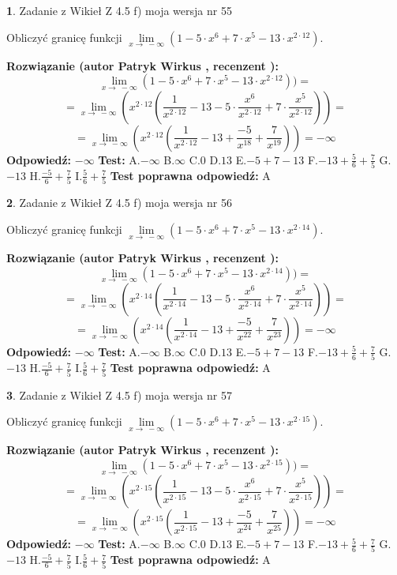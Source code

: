 \documentclass[12pt, a4paper]{article}
\theoremstyle{definition} %
\newtheorem{zad}{}
\newcommand{\zadStart}[1]{\begin{zad}#1\newline}
\newcommand{\zadStop}{\end{zad}}
\newcommand{\rozwStart}[2]{\noindent \textbf{Rozwiązanie (autor #1 , recenzent #2): }\newline}
\newcommand{\rozwStop}{\newline}
\newcommand{\odpStart}{\noindent \textbf{Odpowiedź:}\newline}
\newcommand{\odpStop}{\newline}
\newcommand{\testStart}{\noindent \textbf{Test:}\newline}
\newcommand{\testStop}{\newline}
\newcommand{\kluczStart}{\noindent \textbf{Test poprawna odpowiedź:}\newline}
\newcommand{\kluczStop}{\newline}
\begin{document}
\zadStart{Zadanie z Wikieł Z 4.5 f) moja wersja nr 55}



Obliczyć granicę funkcji  $\lim\limits_{x\to\ -\infty}(1 - 5 \cdot x^{6}+7 \cdot x^{5}- 13 \cdot x^{2\cdot12})$.
\zadStop
\rozwStart{Patryk Wirkus}{}
$$\lim\limits_{x\to\ -\infty}(1 - 5 \cdot x^{6}+7 \cdot x^{5}- 13 \cdot x^{2\cdot12}))=$$
$$=\lim\limits_{x\to\ -\infty}(x^{2\cdot12}(\frac{1}{x^{2\cdot12}}-13 -5 \cdot \frac{x^{6}}{x^{2\cdot12}}+7 \cdot \frac{x^{5}}{x^{2\cdot12}}))=$$
$$=\lim\limits_{x\to\ -\infty}(x^{2\cdot12}(\frac{1}{x^{2\cdot12}}-13 + \frac{-5}{x^{18}}+ \frac{7}{x^{19}}))=-\infty$$
\rozwStop
\odpStart
$-\infty$
\odpStop
\testStart
A.$-\infty$ B.$\infty$ C.$0$ D.$13$ E.$-5 + 7 - 13$
F.$-13+\frac{5}{6}+\frac{7}{5}$ G.$-13$
H.$\frac{-5}{6}+\frac{7}{5}$
I.$\frac{5}{6}+\frac{7}{5}$
\testStop
\kluczStart
A
\kluczStop



\zadStart{Zadanie z Wikieł Z 4.5 f) moja wersja nr 56}



Obliczyć granicę funkcji  $\lim\limits_{x\to\ -\infty}(1 - 5 \cdot x^{6}+7 \cdot x^{5}- 13 \cdot x^{2\cdot14})$.
\zadStop
\rozwStart{Patryk Wirkus}{}
$$\lim\limits_{x\to\ -\infty}(1 - 5 \cdot x^{6}+7 \cdot x^{5}- 13 \cdot x^{2\cdot14}))=$$
$$=\lim\limits_{x\to\ -\infty}(x^{2\cdot14}(\frac{1}{x^{2\cdot14}}-13 -5 \cdot \frac{x^{6}}{x^{2\cdot14}}+7 \cdot \frac{x^{5}}{x^{2\cdot14}}))=$$
$$=\lim\limits_{x\to\ -\infty}(x^{2\cdot14}(\frac{1}{x^{2\cdot14}}-13 + \frac{-5}{x^{22}}+ \frac{7}{x^{23}}))=-\infty$$
\rozwStop
\odpStart
$-\infty$
\odpStop
\testStart
A.$-\infty$ B.$\infty$ C.$0$ D.$13$ E.$-5 + 7 - 13$
F.$-13+\frac{5}{6}+\frac{7}{5}$ G.$-13$
H.$\frac{-5}{6}+\frac{7}{5}$
I.$\frac{5}{6}+\frac{7}{5}$
\testStop
\kluczStart
A
\kluczStop



\zadStart{Zadanie z Wikieł Z 4.5 f) moja wersja nr 57}



Obliczyć granicę funkcji  $\lim\limits_{x\to\ -\infty}(1 - 5 \cdot x^{6}+7 \cdot x^{5}- 13 \cdot x^{2\cdot15})$.
\zadStop
\rozwStart{Patryk Wirkus}{}
$$\lim\limits_{x\to\ -\infty}(1 - 5 \cdot x^{6}+7 \cdot x^{5}- 13 \cdot x^{2\cdot15}))=$$
$$=\lim\limits_{x\to\ -\infty}(x^{2\cdot15}(\frac{1}{x^{2\cdot15}}-13 -5 \cdot \frac{x^{6}}{x^{2\cdot15}}+7 \cdot \frac{x^{5}}{x^{2\cdot15}}))=$$
$$=\lim\limits_{x\to\ -\infty}(x^{2\cdot15}(\frac{1}{x^{2\cdot15}}-13 + \frac{-5}{x^{24}}+ \frac{7}{x^{25}}))=-\infty$$
\rozwStop
\odpStart
$-\infty$
\odpStop
\testStart
A.$-\infty$ B.$\infty$ C.$0$ D.$13$ E.$-5 + 7 - 13$
F.$-13+\frac{5}{6}+\frac{7}{5}$ G.$-13$
H.$\frac{-5}{6}+\frac{7}{5}$
I.$\frac{5}{6}+\frac{7}{5}$
\testStop
\kluczStart
A
\kluczStop
\end{document}
